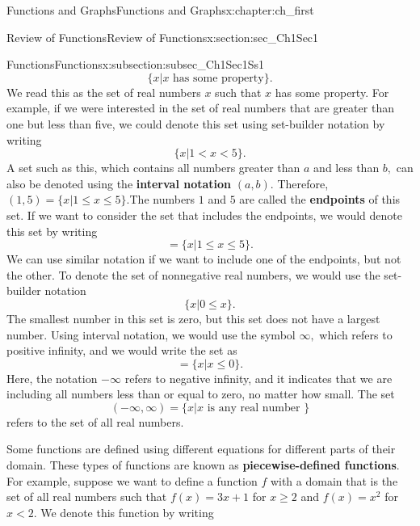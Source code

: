 \documentclass[oneside,10pt,]{book}
\newcommand{\terminology}[1]{\textbf{#1}}
\numberwithin{equation}{section}
\begin{document}
\begin{chapterptx}{Functions and Graphs}{}{Functions and Graphs}{}{}{x:chapter:ch_first}
\begin{sectionptx}{Review of Functions}{}{Review of Functions}{}{}{x:section:sec_Ch1Sec1}
\begin{subsectionptx}{Functions}{}{Functions}{}{}{x:subsection:subsec_Ch1Sec1Ss1}
\begin{equation*}
\{x|x \text{ has some property} \}.
\end{equation*}
We read this as the set of real numbers \(x\) such that \(x\) has some property. For example, if we were interested in the set of real numbers that are greater than one but less than five, we could denote this set using set-builder notation by writing%
%
\begin{equation*}
\{x | 1 < x < 5 \}.
\end{equation*}
A set such as this, which contains all numbers greater than \(a\) and less than \(b,\) can also be denoted using the \terminology{interval notation} \((a,b).\) Therefore,%
\((1,5)=\{x| 1\leq  x \leq  5\}.\)The numbers \(1\) and \(5\) are called the \terminology{endpoints} of this set. If we want to consider the set that includes the endpoints, we would denote this set by writing%
%
\begin{equation*}
[1,5]=\{x|1\leq  x\leq 5\}.
\end{equation*}
We can use similar notation if we want to include one of the endpoints, but not the other. To denote the set of nonnegative real numbers, we would use the set-builder notation%
%
\begin{equation*}
\{x|0\leq  x\}.
\end{equation*}
The smallest number in this set is zero, but this set does not have a largest number. Using interval notation, we would use the symbol \(\infty ,\) which refers to positive infinity, and we would write the set as%
%
\begin{equation*}
[0,\infty)=\{x|0 \leq  x\}.
\end{equation*}
It is important to note that \(\infty\) is not a real number. It is used symbolically here to indicate that this set includes all real numbers greater than or equal to zero. Similarly, if we wanted to describe the set of all nonpositive numbers, we could write%
%
\begin{equation*}
(-\infty,0]=\{x|x \leq  0\}.
\end{equation*}
Here, the notation \(-\infty\) refers to negative infinity, and it indicates that we are including all numbers less than or equal to zero, no matter how small. The set%
%
\begin{equation*}
(-\infty,\infty)=\{x|x \text{ is any real number }\}
\end{equation*}
refers to the set of all real numbers.%
\par
Some functions are defined using different equations for different parts of their domain. These types of functions are known as \terminology{piecewise-defined functions}. For example, suppose we want to define a function \(f\) with a domain that is the set of all real numbers such that \(f(x)=3x+1\) for \(x \geq 2\) and \(f(x)=x^2\) for \(x < 2.\) We denote this function by writing%

\end{subsectionptx}
\end{sectionptx}
\end{chapterptx}
\end{document}
